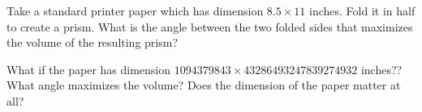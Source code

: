 \documentclass[../main.tex]{subfiles}
\begin{document}
\begin{exercise}
  Take a standard printer paper which has dimension \(8.5 \times 11\) inches. Fold it in half to create a prism. What is the angle between the two folded sides that maximizes the volume of the resulting prism?

  \blanks*

  \faComment{} What if the paper has dimension \(1094379843 \times 43286493247839274932\) inches?? What angle maximizes the volume? Does the dimension of the paper matter at all?
\end{exercise}


%
%
%
%
%
%
%
%
%
%
%
%
%
\end{document}
